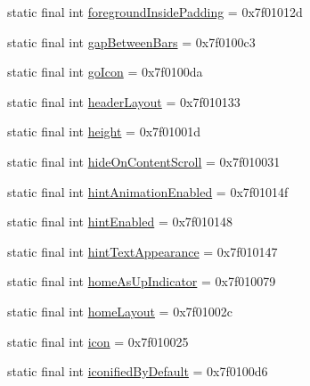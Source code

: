 \begin{CompactItemize}
\item 
static final int \hyperlink{classandroid_1_1support_1_1v7_1_1mediarouter_1_1_r_1_1attr_25411aea7b1b4395bfd5fd311e3de7f3}{foregroundInsidePadding} = 0x7f01012d
\item 
static final int \hyperlink{classandroid_1_1support_1_1v7_1_1mediarouter_1_1_r_1_1attr_b98ec1c5b880dc5bfed9524b20a55cc2}{gapBetweenBars} = 0x7f0100c3
\item 
static final int \hyperlink{classandroid_1_1support_1_1v7_1_1mediarouter_1_1_r_1_1attr_5861695b000113ced9a979537d906a50}{goIcon} = 0x7f0100da
\item 
static final int \hyperlink{classandroid_1_1support_1_1v7_1_1mediarouter_1_1_r_1_1attr_839adae0ea35d068d22b09aaba515d5c}{headerLayout} = 0x7f010133
\item 
static final int \hyperlink{classandroid_1_1support_1_1v7_1_1mediarouter_1_1_r_1_1attr_70bd819efbf5b3b4de5221102e17d1e6}{height} = 0x7f01001d
\item 
static final int \hyperlink{classandroid_1_1support_1_1v7_1_1mediarouter_1_1_r_1_1attr_c4e21a05ce62b4ce3c3386aacb44c125}{hideOnContentScroll} = 0x7f010031
\item 
static final int \hyperlink{classandroid_1_1support_1_1v7_1_1mediarouter_1_1_r_1_1attr_938fe2072c8f0709f1d770b629a1fcfe}{hintAnimationEnabled} = 0x7f01014f
\item 
static final int \hyperlink{classandroid_1_1support_1_1v7_1_1mediarouter_1_1_r_1_1attr_35ddd4804f1fece8814f3d4681f43895}{hintEnabled} = 0x7f010148
\item 
static final int \hyperlink{classandroid_1_1support_1_1v7_1_1mediarouter_1_1_r_1_1attr_8faa4650cf4565021522094ec9fa60fe}{hintTextAppearance} = 0x7f010147
\item 
static final int \hyperlink{classandroid_1_1support_1_1v7_1_1mediarouter_1_1_r_1_1attr_ab77e97339524f00db34ef5ad2b03f94}{homeAsUpIndicator} = 0x7f010079
\item 
static final int \hyperlink{classandroid_1_1support_1_1v7_1_1mediarouter_1_1_r_1_1attr_6878fc7dd59cff8e22071c8fa6dea8cc}{homeLayout} = 0x7f01002c
\item 
static final int \hyperlink{classandroid_1_1support_1_1v7_1_1mediarouter_1_1_r_1_1attr_d41ffa4ee8138d53e76091be368ebc1c}{icon} = 0x7f010025
\item 
static final int \hyperlink{classandroid_1_1support_1_1v7_1_1mediarouter_1_1_r_1_1attr_29a263259ba43067ae2f37d484e0be19}{iconifiedByDefault} = 0x7f0100d6
\item 

\end{CompactItemize}
